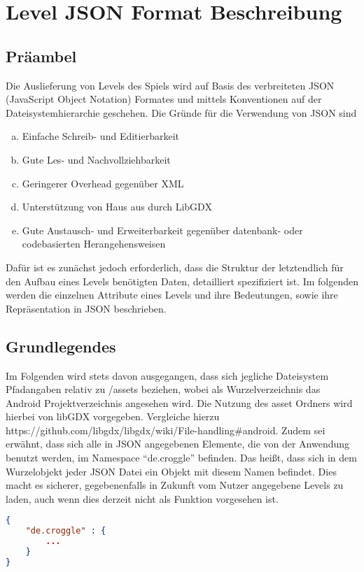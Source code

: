
\chapter{Level JSON Format Beschreibung}
\section{Präambel}
Die Auslieferung von Levels des Spiels wird auf Basis des verbreiteten JSON (JavaScript Object Notation) Formates und mittels Konventionen auf der Dateisystemhierarchie geschehen.
Die Gründe für die Verwendung von JSON sind
\begin{enumerate}[a)]
	\item Einfache Schreib- und Editierbarkeit
	\item Gute Les- und Nachvollziehbarkeit
	\item Geringerer Overhead gegenüber XML
	\item Unterstützung von Haus aus durch LibGDX
	\item Gute Austausch- und Erweiterbarkeit gegenüber datenbank- oder codebasierten Herangehensweisen
\end{enumerate}
Dafür ist es zunächst jedoch erforderlich, dass die Struktur der letztendlich für den Aufbau eines Levels benötigten Daten, detailliert spezifiziert ist.
Im folgenden werden die einzelnen Attribute eines Levels und ihre Bedeutungen, sowie ihre Repräsentation in JSON beschrieben.

\section{Grundlegendes}
Im Folgenden wird stets davon ausgegangen, dass sich jegliche Dateisystem Pfadangaben relativ zu /assets beziehen, wobei als Wurzelverzeichnis das Android Projektverzeichnis angesehen wird.
Die Nutzung des asset Ordners wird hierbei von libGDX vorgegeben.
Vergleiche hierzu https://github.com/libgdx/libgdx/wiki/File-handling\#android.
Zudem sei erwähnt, dass sich alle in JSON angegebenen Elemente, die von der Anwendung benutzt werden, im Namespace "`de.croggle"' befinden.
Das heißt, dass sich in dem Wurzelobjekt jeder JSON Datei ein Objekt mit diesem Namen befindet.
Dies macht es sicherer, gegebenenfalls in Zukunft vom Nutzer angegebene Levels zu laden, auch wenn dies derzeit nicht als Funktion vorgesehen ist.
\begin{lstlisting}[language=json,caption={Standardinhalt jeder JSON Datei der Anwendung}]
{
	"de.croggle" : {
		...
	}
}
\end{lstlisting}


